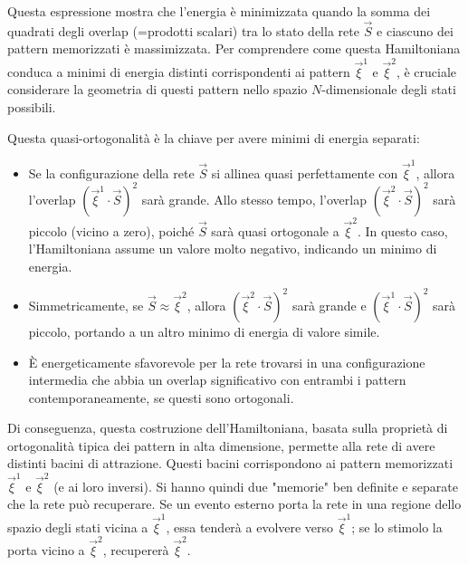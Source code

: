 Questa espressione mostra che l'energia è minimizzata quando la somma dei quadrati degli overlap (=prodotti scalari) tra lo stato della rete $\vec{S}$ e ciascuno dei pattern memorizzati è massimizzata.
Per comprendere come questa Hamiltoniana conduca a minimi di energia distinti corrispondenti ai pattern $\vec{\xi}^1$ e $\vec{\xi}^2$, è cruciale considerare la geometria di questi pattern nello spazio $N$-dimensionale degli stati possibili.

\vspace{0.5cm}
\noindent{}
\vspace{0.5cm}

Questa quasi-ortogonalità è la chiave per avere minimi di energia separati:

\begin{itemize}
    \item Se la configurazione della rete $\vec{S}$ si allinea quasi perfettamente con $\vec{\xi}^1$, allora l'overlap $(\vec{\xi}^1 \cdot \vec{S})^2$ sarà grande. Allo stesso tempo, l'overlap $(\vec{\xi}^2 \cdot \vec{S})^2$ sarà piccolo (vicino a zero), poiché $\vec{S}$ sarà quasi ortogonale a $\vec{\xi}^2$. In questo caso, l'Hamiltoniana assume un valore molto negativo, indicando un minimo di energia.
    \item Simmetricamente, se $\vec{S} \approx \vec{\xi}^2$, allora $(\vec{\xi}^2 \cdot \vec{S})^2$ sarà grande e $(\vec{\xi}^1 \cdot \vec{S})^2$ sarà piccolo, portando a un altro minimo di energia di valore simile.
    \item È energeticamente sfavorevole per la rete trovarsi in una configurazione intermedia che abbia un overlap significativo con entrambi i pattern contemporaneamente, se questi sono ortogonali.
\end{itemize}

Di conseguenza, questa costruzione dell'Hamiltoniana, basata sulla proprietà di ortogonalità tipica dei pattern in alta dimensione, permette alla rete di avere distinti bacini di attrazione. Questi bacini corrispondono ai pattern memorizzati $\vec{\xi}^1$ e $\vec{\xi}^2$ (e ai loro inversi). Si hanno quindi due "memorie" ben definite e separate che la rete può recuperare. Se un evento esterno porta la rete in una regione dello spazio degli stati vicina a $\vec{\xi}^1$, essa tenderà a evolvere verso $\vec{\xi}^1$; se lo stimolo la porta vicino a $\vec{\xi}^2$, recupererà $\vec{\xi}^2$.

